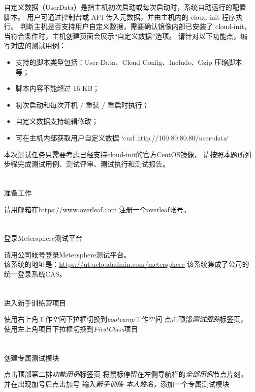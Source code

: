 \documentclass[12pt,addpoints,fleqn]{exam}
\begin{document}
\begin{questions}
\newpage
\question[40] 
自定义数据（UserData）是指主机初次启动或每次启动时，系统自动运行的配置脚本。
用户可通过控制台或 API 传入元数据，并由主机内的 cloud-init 程序执行。
判断主机是否支持用户自定义数据，需要确认镜像内部已安装了 cloud-init，
当符合条件时，主机创建页面会展示“自定义数据”选项。
请针对以下功能点，编写对应的测试用例：

\begin{itemize}
  \item 支持的脚本类型包括：User-Data、Cloud Config、Include、Gzip 压缩脚本等；
  \item 脚本内容不能超过 16 KB；
  \item 初次启动和每次开机 / 重装 / 重启时执行；
  \item 自定义数据支持编辑修改；
  \item 可在主机内部获取用户自定义数据 `curl http://100.80.80.80/user-data`
\end{itemize}
本次测试任务只需要考虑已经支持cloud-init的官方CentOS镜像，
请按照本题所列步骤完成测试用例、测试评审、测试执行和测试报告。

\begin{parts}
  \part{}准备工作

  请用邮箱在\href{https://www.overleaf.com}{https://www.overleaf.com} 注册一个overleaf帐号。
  
  \part{}登录Metersphere测试平台

  请用公司帐号登录Metersphere测试平台。\\
  该系统的地址是：\href{https://ut.ucloudadmin.com/metersphere}{https://ut.ucloudadmin.com/metersphere}
  该系统集成了公司的统一登录系统CAS。
  
  \part{}进入新手训练营项目
  \begin{subparts}
    \subpart{}使用右上角工作空间下拉框切换到\emph{bootcamp}工作空间
    \subpart{}点击顶部\emph{测试跟踪}标签页，使用左上角项目下拉框切换到\emph{FirstClass}项目
  \end{subparts}

  \part{}创建专属测试模块
  \begin{subparts}
    \subpart{}点击顶部第二排\emph{功能用例}标签页
    \subpart{}将鼠标停留在左侧导航栏的\emph{全部用例}节点片刻，并在出现加号后点击加号
    \subpart{}输入\emph{新手训练-本人姓名}，添加一个专属测试模块
  \end{subparts}


\end{parts}
\end{questions}
\end{document}
